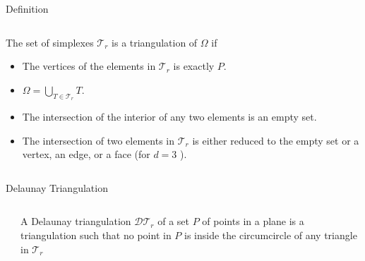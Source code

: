 \documentclass[10pt]{beamer}
\begin{document}
\begin{frame}{Definition}
\begin{columns}
\begin{column}{0.7\textwidth}
		The set of simplexes $\mathcal{T}_r$ is \alert{a triangulation} of $\Omega$ if
		\begin{itemize}
			\item The vertices of the elements in $ \mathcal{T}_r$ is exactly $P$.
			\item $ \Omega = \bigcup_{T \in \mathcal{T}_r}  T $.
			\item The intersection of the interior of any two elements is an empty set.
			\item The intersection of two elements in  $\mathcal{T}_r$ is either reduced to
				  the empty set or a vertex, an edge, or a face (for $d=3$ ).
		\end{itemize}
	\end{column}
\end{columns}
\end{frame}

\begin{frame}{Delaunay Triangulation}
\begin{columns}
	\begin{column}{0.4\textwidth} 
		\end{column}
		\begin{column}{0.6\textwidth}
			A \alert{Delaunay triangulation $\mathcal{DT}_r$} of a set $P$ of points in a plane  
			is a triangulation such that no point in $P$ is inside the circumcircle of any
			triangle in $\mathcal{T}_r$  
		\end{column}
\end{columns}
\end{frame}
\end{document}
